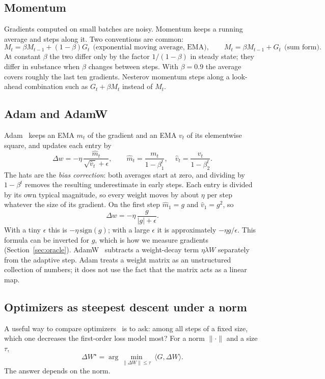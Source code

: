 \documentclass[11pt]{article}
\begin{document}
\subsection{Momentum}
Gradients computed on small batches are noisy. Momentum keeps a running average and steps along
it. Two conventions are common:
\[
M_t=\beta M_{t-1}+(1-\beta)G_t\ \ \text{(exponential moving average, EMA)},\qquad
M_t=\beta M_{t-1}+G_t\ \ \text{(sum form)}.
\]
At constant $\beta$ the two differ only by the factor $1/(1-\beta)$ in steady state; they differ in
substance when $\beta$ changes between steps. With $\beta=0.9$ the average covers roughly the last
ten gradients. Nesterov momentum steps along a look-ahead combination such as $G_t+\beta M_t$
instead of $M_t$.

\subsection{Adam and AdamW}
Adam~\cite{adam} keeps an EMA $m_t$ of the gradient and an EMA $v_t$ of its elementwise square, and
updates each entry by
\[
\Delta w=-\eta\,\frac{\hat m_t}{\sqrt{\hat v_t}+\epsilon},\qquad
\hat m_t=\frac{m_t}{1-\beta_1^t},\quad \hat v_t=\frac{v_t}{1-\beta_2^t}.
\]
The hats are the \emph{bias correction}: both averages start at zero, and dividing by
$1-\beta^t$ removes the resulting underestimate in early steps. Each entry is divided by its own
typical magnitude, so every weight moves by about $\eta$ per step whatever the size of its
gradient. On the first step $\hat m_1=g$ and $\hat v_1=g^2$, so
\[
\Delta w=-\eta\,\frac{g}{|g|+\epsilon}.
\]
With a tiny $\epsilon$ this is $-\eta\,\mathrm{sign}(g)$; with a large $\epsilon$ it is
approximately $-\eta g/\epsilon$. This formula can be inverted for $g$, which is how we measure
gradients (Section~\ref{sec:oracle}). AdamW~\cite{adamw} subtracts a weight-decay term $\eta\lambda W$
separately from the adaptive step. Adam treats a weight matrix as an unstructured collection of
numbers; it does not use the fact that the matrix acts as a linear map.

\subsection{Optimizers as steepest descent under a norm}\label{sec:steepest}
A useful way to compare optimizers~\cite{bernstein2024} is to ask: among all steps of a fixed size,
which one decreases the first-order loss model most? For a norm $\|\cdot\|$ and a size $\tau$,
\begin{equation}\label{eq:lmo}
\Delta W^\star=\arg\min_{\|\Delta W\|\le\tau}\ \langle G,\Delta W\rangle .
\end{equation}
The answer depends on the norm.
\end{document}
